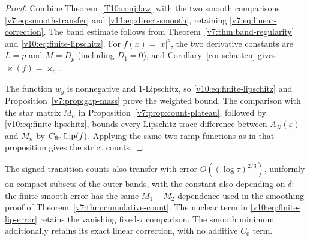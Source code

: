 \begin{proof}
Combine Theorem~\ref{T10:conj:law} with the two smooth comparisons
\eqref{v7:eq:smooth-transfer} and \eqref{v11:eq:direct-smooth}, retaining
\eqref{v7:eq:linear-correction}. The band estimate follows from
Theorem~\ref{v7:thm:band-regularity} and
\eqref{v10:eq:finite-lipschitz}. For $f(x)=|x|^p$, the two derivative
constants are $L=p$ and $M=D_p$ (including $D_1=0$), and
Corollary~\ref{cor:schatten} gives $\varkappa(f)=\varkappa_p$.

The function $w_g$ is nonnegative and $1$-Lipschitz, so
\eqref{v10:eq:finite-lipschitz} and Proposition~\ref{v7:prop:gap-mass}
prove the weighted bound. The comparison with the star matrix $M_n$
in Proposition~\ref{v7:prop:count-plateau}, followed by
\eqref{v10:eq:finite-lipschitz}, bounds every Lipschitz trace difference
between $A_N(\varepsilon)$ and $M_n$ by
$C_{\rm fin}\operatorname{Lip}(f)$. Applying the same two ramp functions
as in that proposition gives the strict counts.
\end{proof}

The signed transition counts also transfer with error
$O((\log\tau)^{2/3})$, uniformly on compact subsets of the outer bands,
with the constant also depending on $\delta$: the finite smooth error
has the same $M_1+M_2$ dependence used
in the smoothing proof of Theorem~\ref{v7:thm:cumulative-count}.
The nuclear term in \eqref{v10:eq:finite-lip-error} retains the vanishing
fixed-$\tau$ comparison. The smooth minimum additionally retains its
exact linear correction, with no additive $C_0$ term.

